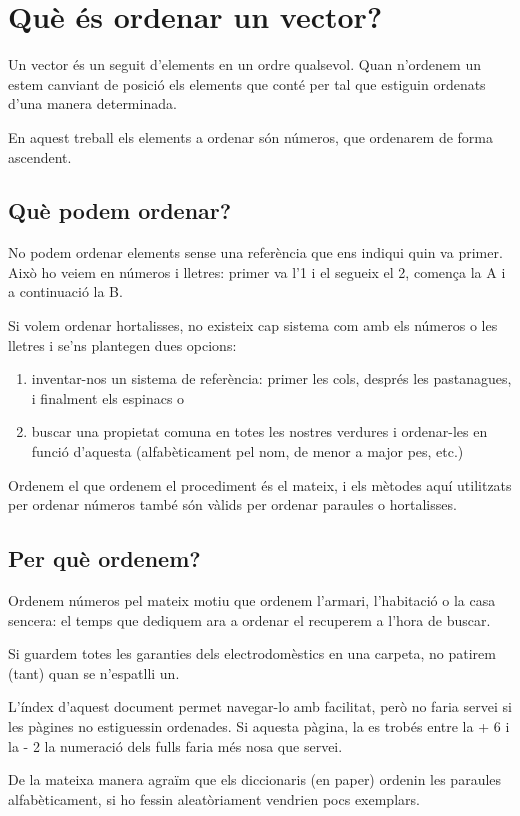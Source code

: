 \chapter{Què és ordenar un vector?}
Un vector és un seguit d'elements en un ordre qualsevol.
Quan n'ordenem un estem canviant de posició els elements que conté per tal que estiguin ordenats d'una manera determinada.

En aquest treball els elements a ordenar són números, que ordenarem de forma ascendent.

\section{Què podem ordenar?}
No podem ordenar elements sense una referència que ens indiqui quin va primer.
Això ho veiem en números i lletres: primer va l'1 i el segueix el 2, comença la A i a continuació la B.

Si volem ordenar hortalisses, no existeix cap sistema com amb els números o les lletres i se'ns plantegen dues opcions:
\begin{enumerate}[label={\alph*)}]
	\item inventar-nos un sistema de referència: primer les cols, després les pastanagues, i finalment els espinacs o
	\item buscar una propietat comuna en totes les nostres verdures i ordenar-les en funció d'aquesta (alfabèticament pel nom, de menor a major pes, etc.)
\end{enumerate}

Ordenem el que ordenem el procediment és el mateix, i els mètodes aquí utilitzats per ordenar números també són vàlids per ordenar paraules o hortalisses.

\pagebreak
\section{Per què ordenem?}
Ordenem números pel mateix motiu que ordenem l'armari, l'habitació o la casa sencera: el temps que dediquem ara a ordenar el recuperem a l'hora de buscar.

Si guardem totes les garanties dels electrodomèstics en una carpeta, no patirem (tant) quan se n'espatlli un.

L'índex d'aquest document permet navegar-lo amb facilitat, però no faria servei si les pàgines no estiguessin ordenades. Si aquesta pàgina, la {\thepage} es trobés entre la {\the\numexpr \thepage + 6} i la {\the\numexpr \thepage - 2} la numeració dels fulls faria més nosa que servei.

De la mateixa manera agraïm que els diccionaris (en paper) ordenin les paraules alfabèticament, si ho fessin aleatòriament vendrien pocs exemplars.